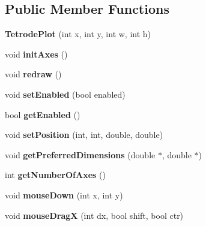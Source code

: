 \subsection*{Public Member Functions}
\begin{DoxyCompactItemize}
\item 
\hypertarget{classTetrodePlot_a656ee6137f078f758e1be6dcfdddbc21}{{\bfseries Tetrode\-Plot} (int x, int y, int w, int h)}\label{classTetrodePlot_a656ee6137f078f758e1be6dcfdddbc21}

\item 
\hypertarget{classTetrodePlot_ae440c2b24680f270d8dd5458280c9d64}{void {\bfseries init\-Axes} ()}\label{classTetrodePlot_ae440c2b24680f270d8dd5458280c9d64}

\item 
\hypertarget{classTetrodePlot_a6d4494f6721849cad393a7be6ff6ef72}{void {\bfseries redraw} ()}\label{classTetrodePlot_a6d4494f6721849cad393a7be6ff6ef72}

\item 
\hypertarget{classTetrodePlot_a9791b6a0cc8f8378edbc37ff054feca2}{void {\bfseries set\-Enabled} (bool enabled)}\label{classTetrodePlot_a9791b6a0cc8f8378edbc37ff054feca2}

\item 
\hypertarget{classTetrodePlot_a9128abaa352225ddb4959408f8b30f2e}{bool {\bfseries get\-Enabled} ()}\label{classTetrodePlot_a9128abaa352225ddb4959408f8b30f2e}

\item 
\hypertarget{classTetrodePlot_ae3a380278f0197a92bb5a359a75553b8}{void {\bfseries set\-Position} (int, int, double, double)}\label{classTetrodePlot_ae3a380278f0197a92bb5a359a75553b8}

\item 
\hypertarget{classTetrodePlot_ac1c5202ac6a0ecfdcc846657c597b76d}{void {\bfseries get\-Preferred\-Dimensions} (double $\ast$, double $\ast$)}\label{classTetrodePlot_ac1c5202ac6a0ecfdcc846657c597b76d}

\item 
\hypertarget{classTetrodePlot_ae7a0c92060e12abe0c407324a4f572d8}{int {\bfseries get\-Number\-Of\-Axes} ()}\label{classTetrodePlot_ae7a0c92060e12abe0c407324a4f572d8}

\item 
\hypertarget{classTetrodePlot_abff5bd0246a2b648ebd6dfc1a0f93f4a}{void {\bfseries mouse\-Down} (int x, int y)}\label{classTetrodePlot_abff5bd0246a2b648ebd6dfc1a0f93f4a}

\item 
\hypertarget{classTetrodePlot_ae695cb5485e28e7eb925207fe0b89630}{void {\bfseries mouse\-Drag\-X} (int dx, bool shift, bool ctr)}\label{classTetrodePlot_ae695cb5485e28e7eb925207fe0b89630}


\end{DoxyCompactItemize}
